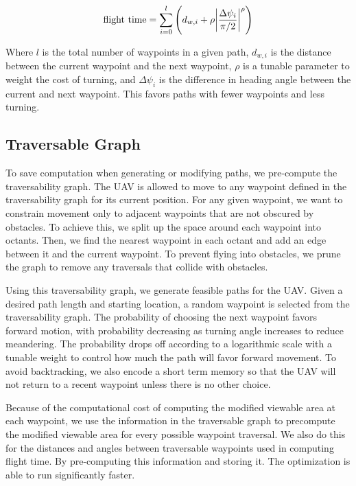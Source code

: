 \documentclass[letterpaper, 10 pt, conference]{ieeeconf}  %
\begin{document}
\begin{equation}%
    \text{flight time} = \sum_{i=0}^{l} \left(d_{w,i} + \rho\abs{\frac{\Delta \psi_i}{\pi/2}}^{\rho}\right)
\end{equation}

Where $l$ is the total number of waypoints in a given path, $d_{w,i}$ is the distance between the current waypoint and the next waypoint, $\rho$ is a tunable parameter to weight the cost of turning, and $\Delta \psi_i$ is the difference in heading angle between the current and next waypoint. This favors paths with fewer waypoints and less turning.

\subsection{Traversable Graph}

To save computation when generating or modifying paths, we pre-compute the traversability graph. The UAV is allowed to move to any waypoint defined in the traversability graph for its current position. For any given waypoint, we want to constrain movement only to adjacent waypoints that are not obscured by obstacles. To achieve this, we split up the space around each waypoint into octants. Then, we find the nearest waypoint in each octant and add an edge between it and the current waypoint. To prevent flying into obstacles, we prune the graph to remove any traversals that collide with obstacles.

Using this traversability graph, we generate feasible paths for the UAV. Given a desired path length and starting location, a random waypoint is selected from the traversability graph. The probability of choosing the next waypoint favors forward motion, with probability decreasing as turning angle increases to reduce meandering. The probability drops off according to a logarithmic scale with a tunable weight to control how much the path will favor forward movement. To avoid backtracking, we also encode a short term memory so that the UAV will not return to a recent waypoint unless there is no other choice.

Because of the computational cost of computing the modified viewable area at each waypoint, we use the information in the traversable graph to precompute the modified viewable area for every possible waypoint traversal. We also do this for the distances and angles between traversable waypoints used in computing flight time. By pre-computing this information and storing it. The optimization is able to run significantly faster.
\end{document}
